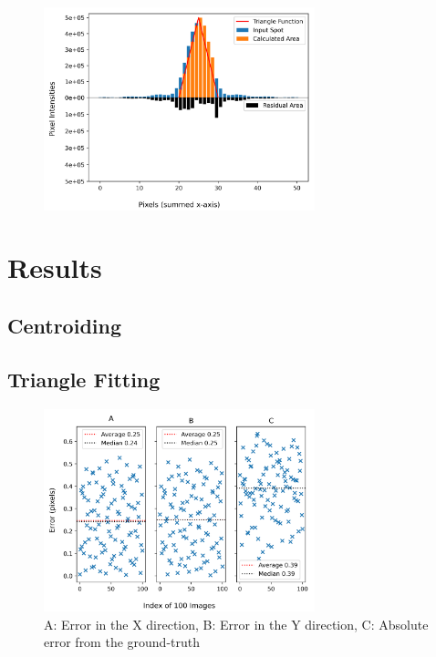 \documentclass[aps,pra,a4paper,nofootinbib,onecolumn,tightenlines,longbibliography,12pt,amsfonts,amssymb,amsmath,floatfix]{revtex4-2} %
\begin{document}
    \begin{figure}[h]
      \begin{center}
        \includegraphics[width=0.7\textwidth]{project_pics/visual_test.png}
      \end{center}
      \caption{}
      \label{fig:visual_test}
    \end{figure}
    
    
    

\section{Results} %
\label{sec:Results}

  \subsection{Centroiding} %
  \label{sub:Centroiding_results}
  
  \subsection{Triangle Fitting} %
  \label{sub:Triangle Fitting}

  \begin{figure}[H]
      \begin{center}
        \includegraphics[width=0.7\textwidth]{project_pics/single_test.png}
      \end{center}
      \caption{A: Error in the X direction, B: Error in the Y direction, C: Absolute error from the ground-truth}
      \label{fig:single_test}
    \end{figure}
\end{document}
